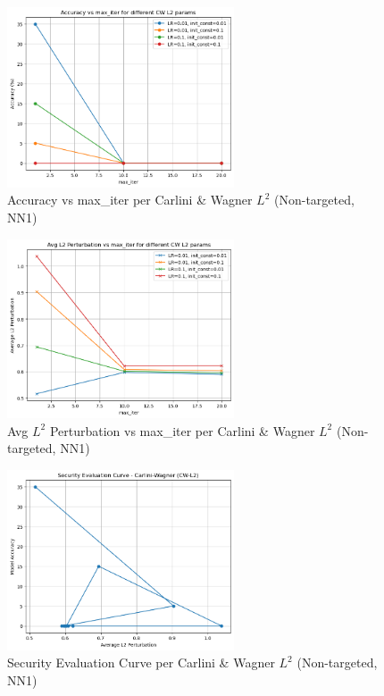             \begin{figure}[H]
                \centering
                \includegraphics[width=0.6\textwidth]{images/accvsmaxl2.png}
                \caption{Accuracy vs max\_iter per Carlini \& Wagner $L^2$ (Non-targeted, NN1)}
                \label{fig:cw_untarg_l2_acc}
            \end{figure}
            
            \begin{figure}[H]
                \centering
                \includegraphics[width=0.6\textwidth]{images/avgpub_vs_maxiter_l2.png}
                \caption{Avg $L^2$ Perturbation vs max\_iter per Carlini \& Wagner $L^2$ (Non-targeted, NN1)}
                \label{fig:cw_untarg_l2_pert}
            \end{figure}
            
            \begin{figure}[H]
                \centering
                \includegraphics[width=0.6\textwidth]{images/sec_unt_cw_l2.png}
                \caption{Security Evaluation Curve per Carlini \& Wagner $L^2$ (Non-targeted, NN1)}
                \label{fig:cw_untarg_l2_sec}
            \end{figure}
            
